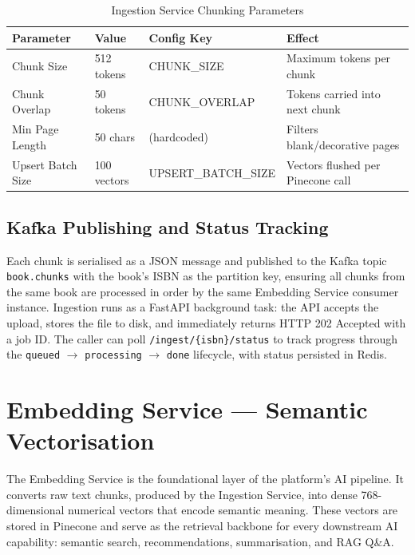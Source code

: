 \begin{table}[H]
\centering
\caption{Ingestion Service Chunking Parameters}
\label{tab:chunking}
\begin{tabularx}{\textwidth}{|l|l|l|X|}
\hline
\textbf{Parameter} & \textbf{Value} & \textbf{Config Key} & \textbf{Effect} \\
\hline
Chunk Size        & 512 tokens & CHUNK\_SIZE        & Maximum tokens per chunk \\
\hline
Chunk Overlap     & 50 tokens  & CHUNK\_OVERLAP     & Tokens carried into next chunk \\
\hline
Min Page Length   & 50 chars   & (hardcoded)        & Filters blank/decorative pages \\
\hline
Upsert Batch Size & 100 vectors & UPSERT\_BATCH\_SIZE & Vectors flushed per Pinecone call \\
\hline
\end{tabularx}
\end{table}

\subsection{Kafka Publishing and Status Tracking}

Each chunk is serialised as a JSON message and published to the Kafka topic
\texttt{book.chunks} with the book's ISBN as the partition key, ensuring all
chunks from the same book are processed in order by the same Embedding Service
consumer instance. Ingestion runs as a FastAPI background task: the API accepts
the upload, stores the file to disk, and immediately returns HTTP 202 Accepted
with a job ID. The caller can poll \texttt{/ingest/\{isbn\}/status} to track
progress through the \texttt{queued} $\rightarrow$ \texttt{processing}
$\rightarrow$ \texttt{done} lifecycle, with status persisted in Redis.

\section{Embedding Service --- Semantic Vectorisation}
\label{sec:embedding}

The Embedding Service is the foundational layer of the platform's AI pipeline.
It converts raw text chunks, produced by the Ingestion Service, into dense
768-dimensional numerical vectors that encode semantic meaning. These vectors
are stored in Pinecone and serve as the retrieval backbone for every downstream
AI capability: semantic search, recommendations, summarisation, and RAG Q\&A.

